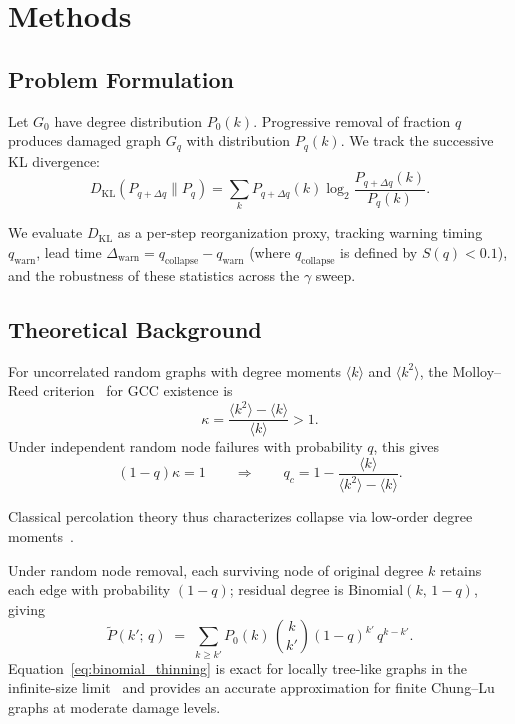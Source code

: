 \documentclass{nws}
\begin{document}
\section{Methods}

\subsection{Problem Formulation}

Let $G_0$ have degree distribution $P_0(k)$. Progressive removal of fraction $q$ produces
damaged graph $G_q$ with distribution $P_q(k)$. We track the successive KL divergence:
\[
D_{\mathrm{KL}}(P_{q+\Delta q} \| P_q) = \sum_k P_{q+\Delta q}(k) \log_2 \frac{P_{q+\Delta
q}(k)}{P_q(k)}.
\]

We evaluate $D_{\mathrm{KL}}$ as a per-step reorganization proxy, tracking warning timing
$q_{\mathrm{warn}}$, lead time $\Delta_{\mathrm{warn}}=q_{\mathrm{collapse}}-q_{\mathrm{warn}}$
(where $q_{\mathrm{collapse}}$ is defined by $S(q)<0.1$), and the robustness of these
statistics across the $\gamma$ sweep.


\subsection{Theoretical Background}

For uncorrelated random graphs with degree moments $\langle k \rangle$ and
$\langle k^2 \rangle$, the Molloy--Reed criterion~\citep{molloy1995critical,molloy1998size}
for GCC existence is
\[
\kappa = \frac{\langle k^2 \rangle - \langle k \rangle}{\langle k \rangle} > 1.
\]
Under independent random node failures with probability $q$, this gives
\[
(1 - q)\kappa = 1
\qquad \Rightarrow \qquad
q_c = 1 - \frac{\langle k \rangle}{\langle k^2 \rangle - \langle k \rangle}.
\]

Classical percolation theory thus characterizes collapse via low-order degree moments~\citep{dorogovtsev2008critical}.

Under random node removal, each surviving node of original degree $k$ retains each edge with probability $(1-q)$;
residual degree is Binomial$(k,\,1{-}q)$, giving
\begin{equation}
\tilde{P}(k';\,q)
\;=\;
\sum_{k \ge k'} P_0(k)\,\binom{k}{k'}(1-q)^{k'}\,q^{k-k'}.
\label{eq:binomial_thinning}
\end{equation}
Equation~\ref{eq:binomial_thinning} is exact for locally tree-like graphs in the infinite-size limit~\citep{callaway2000network,cohen2000resilience} and provides an accurate approximation for finite Chung--Lu graphs at moderate damage levels.
\end{document}
